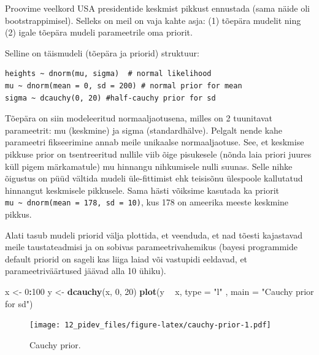 \documentclass[]{book}
\newenvironment{Shaded}{\begin{snugshade}}{\end{snugshade}}
\newcommand{\KeywordTok}[1]{\textcolor[rgb]{0.13,0.29,0.53}{\textbf{#1}}}
\newcommand{\DataTypeTok}[1]{\textcolor[rgb]{0.13,0.29,0.53}{#1}}
\newcommand{\DecValTok}[1]{\textcolor[rgb]{0.00,0.00,0.81}{#1}}
\newcommand{\StringTok}[1]{\textcolor[rgb]{0.31,0.60,0.02}{#1}}
\newcommand{\OperatorTok}[1]{\textcolor[rgb]{0.81,0.36,0.00}{\textbf{#1}}}
\newcommand{\NormalTok}[1]{#1}
\begin{document}
Proovime veelkord USA presidentide keskmist pikkust ennustada (sama
näide oli bootstrappimisel). Selleks on meil on vaja kahte asja: (1)
tõepära mudelit ning (2) igale tõepära mudeli parameetrile oma priorit.

Selline on täismudeli (tõepära ja priorid) struktuur:

\begin{verbatim}
heights ~ dnorm(mu, sigma)  # normal likelihood
mu ~ dnorm(mean = 0, sd = 200) # normal prior for mean
sigma ~ dcauchy(0, 20) #half-cauchy prior for sd 
\end{verbatim}

Tõepära on siin modeleeritud normaaljaotusena, milles on 2 tuunitavat
parameetrit: mu (keskmine) ja sigma (standardhälve). Pelgalt nende kahe
parameetri fikseerimine annab meile unikaalse normaaljaotuse. See, et
keskmise pikkuse prior on tsentreeritud nullile viib õige pisukesele
(nõnda laia priori juures küll pigem märkamatule) mu hinnangu
nihkumisele nulli suunas. Selle nihke õigustus on püüd vältida mudeli
üle-fittimist ehk teisisõnu ülespoole kallutatud hinnangut keskmisele
pikkusele. Sama hästi võiksime kasutada ka priorit
\texttt{mu\ \textasciitilde{}\ dnorm(mean\ =\ 178,\ sd\ =\ 10)}, kus 178
on ameerika meeste keskmine pikkus.

Alati tasub mudeli priorid välja plottida, et veenduda, et nad tõesti
kajastavad meile taustateadmisi ja on sobivas parameetrivahemikus
(bayesi programmide default priorid on sageli kas liiga laiad või
vastupidi eeldavad, et parameetriväärtused jäävad alla 10 ühiku).



\begin{Shaded}
\begin{Highlighting}[]
\NormalTok{x <-}\StringTok{ }\DecValTok{0}\OperatorTok{:}\DecValTok{100}
\NormalTok{y <-}\StringTok{ }\KeywordTok{dcauchy}\NormalTok{(x, }\DecValTok{0}\NormalTok{, }\DecValTok{20}\NormalTok{)}
\KeywordTok{plot}\NormalTok{(y }\OperatorTok{~}\StringTok{ }\NormalTok{x, }\DataTypeTok{type =} \StringTok{"l"}\NormalTok{ , }\DataTypeTok{main =} \StringTok{"Cauchy prior for sd"}\NormalTok{)}
\end{Highlighting}
\end{Shaded}

\begin{figure}
\centering
\texttt{[image: 12\_pidev\_files/figure-latex/cauchy-prior-1.pdf]}
\caption{\label{fig:cauchy-prior}Cauchy prior.}
\end{figure}
\end{document}

